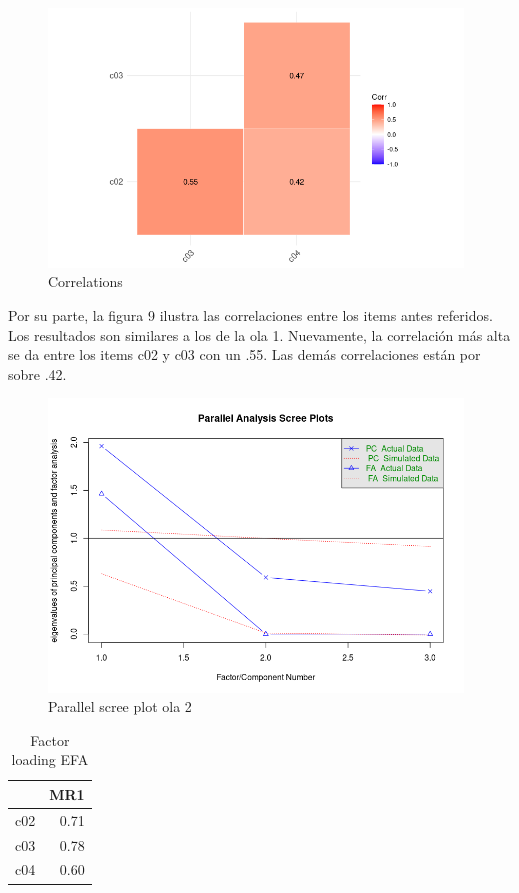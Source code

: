 \begin{figure}[H]
    \centering
    \includegraphics[width=11cm]{output/corrplot2.png}
    \caption{Correlations}
    \label{fig:corr2}
\end{figure}

Por su parte, la figura 9 ilustra las correlaciones entre los items antes referidos. Los resultados son similares a los de la ola 1. Nuevamente, la correlación más alta se da entre los items c02 y c03 con un .55. Las demás correlaciones están por sobre .42. 

\begin{figure}[H]
    \centering
    \includegraphics[width=11cm]{output/scree_plots2.png}
    \caption{Parallel scree plot ola 2}
    \label{fig:scree2}
\end{figure}


\begin{table}[ht]
\centering
\caption{Factor loading EFA}
\begin{tabular}{rr}
  \hline
 & MR1 \\ 
  \hline
c02 & 0.71 \\ 
  c03 & 0.78 \\ 
  c04 & 0.60 \\ 
   \hline
\end{tabular}
\end{table}

